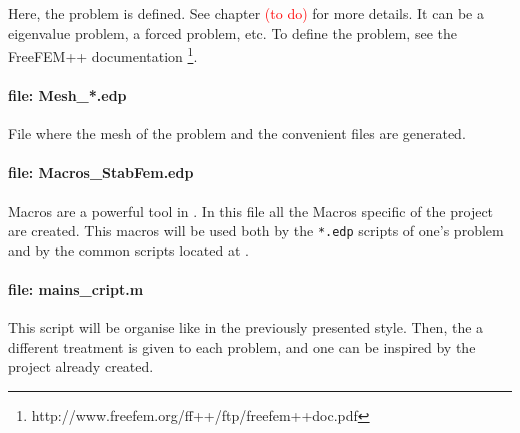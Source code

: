 Here, the problem is defined. See chapter \textcolor{red}{(to do)} for more details. It can be a eigenvalue problem, a forced problem, etc. To define the problem, see the FreeFEM++ documentation \cite{FFdoc}\footnote{http://www.freefem.org/ff++/ftp/freefem++doc.pdf}.

\paragraph{ file: Mesh\_*.edp}

File where the mesh of the problem and the convenient files are generated.

\paragraph{ file: Macros\_StabFem.edp}

Macros are a powerful tool in . In this file all the Macros specific of the project are created. This macros will be used both by the \texttt{*.edp} scripts of one's problem and by the  common scripts located at . 


\paragraph{ file: mains\_cript.m}

This script will be organise like in the previously presented style. Then, the a  different treatment is given to each problem, and one can be inspired by the project already created.



